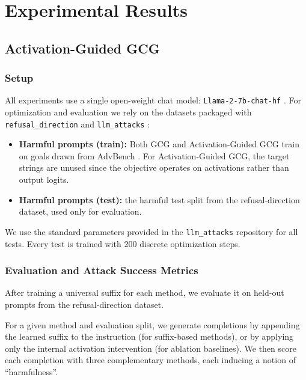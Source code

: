 \documentclass[letterpaper]{article} %
\begin{document}
\section{Experimental Results}

\subsection{Activation-Guided GCG}

\subsubsection{Setup}

  All experiments use a single open-weight chat model: \texttt{Llama-2-7b-chat-hf} \citep{touvron2023llama2openfoundation}. For optimization and evaluation we rely on the datasets packaged with
  \texttt{refusal\_direction} \citep{arditi2024refusal} and \texttt{llm\_attacks} \citep{zou2023universal}:

  \begin{itemize}
    \item \textbf{Harmful prompts (train):} Both GCG and Activation-Guided GCG train on goals drawn from AdvBench \citep{zou2023universal}. For Activation-Guided GCG, the target strings are unused since the objective operates on activations rather than output logits.
    \item \textbf{Harmful prompts (test):} the harmful test split from the refusal-direction dataset, used only for evaluation.
  \end{itemize}

  We use the standard parameters provided in the \texttt{llm\_attacks} repository for all tests. Every test is trained with 200 discrete optimization steps.

  \subsubsection{Evaluation and Attack Success Metrics}

  After training a universal suffix for each method, we evaluate it on held-out
  prompts from the refusal-direction dataset.
  
  For a given method and evaluation split, we generate completions by appending
  the learned suffix to the instruction (for suffix-based methods), or by applying
  only the internal activation intervention (for ablation baselines). We then
  score each completion with three complementary methods, each inducing a notion
  of ``harmfulness''.
\end{document}

